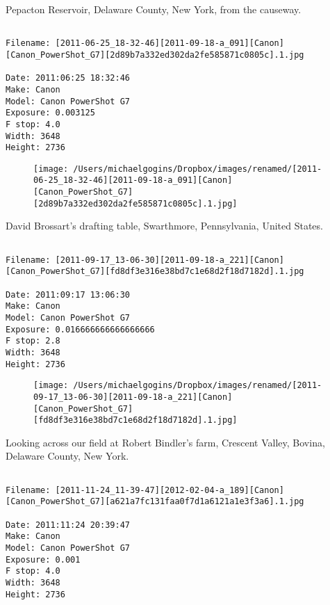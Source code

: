 \documentclass[11pt,letter,DIV=14,paper=landscape]{scrbook}
\begin{document}
\clearpage
\noindent Pepacton Reservoir, Delaware County, New York, from the causeway.
\noindent
\begin{lstlisting}

Filename: [2011-06-25_18-32-46][2011-09-18-a_091][Canon][Canon_PowerShot_G7][2d89b7a332ed302da2fe585871c0805c].1.jpg

Date: 2011:06:25 18:32:46
Make: Canon
Model: Canon PowerShot G7
Exposure: 0.003125
F stop: 4.0
Width: 3648
Height: 2736
\end{lstlisting}
\clearpage

\begin{figure}
\texttt{[image: /Users/michaelgogins/Dropbox/images/renamed/[2011-06-25\_18-32-46][2011-09-18-a\_091][Canon][Canon\_PowerShot\_G7][2d89b7a332ed302da2fe585871c0805c].1.jpg]}
\end{figure}
    
\clearpage
\noindent David Brossart's drafting table, Swarthmore, Pennsylvania, United States.
\noindent
\begin{lstlisting}

Filename: [2011-09-17_13-06-30][2011-09-18-a_221][Canon][Canon_PowerShot_G7][fd8df3e316e38bd7c1e68d2f18d7182d].1.jpg

Date: 2011:09:17 13:06:30
Make: Canon
Model: Canon PowerShot G7
Exposure: 0.016666666666666666
F stop: 2.8
Width: 3648
Height: 2736
\end{lstlisting}
\clearpage

\begin{figure}
\texttt{[image: /Users/michaelgogins/Dropbox/images/renamed/[2011-09-17\_13-06-30][2011-09-18-a\_221][Canon][Canon\_PowerShot\_G7][fd8df3e316e38bd7c1e68d2f18d7182d].1.jpg]}
\end{figure}
    
\clearpage
\noindent Looking across our field at Robert Bindler's farm, Crescent Valley, Bovina, Delaware County, New York.
\noindent
\begin{lstlisting}

Filename: [2011-11-24_11-39-47][2012-02-04-a_189][Canon][Canon_PowerShot_G7][a621a7fc131faa0f7d1a6121a1e3f3a6].1.jpg

Date: 2011:11:24 20:39:47
Make: Canon
Model: Canon PowerShot G7
Exposure: 0.001
F stop: 4.0
Width: 3648
Height: 2736
\end{lstlisting}
\clearpage
\end{document}
